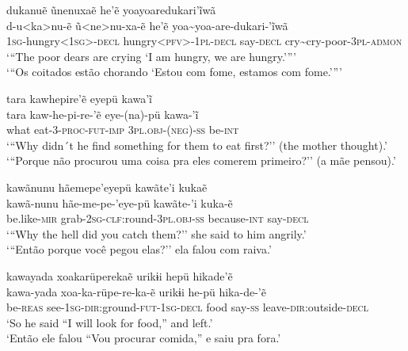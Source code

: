 \documentclass[output=paper,
modfonts,nonflat
]{langsci/langscibook}
\begin{document}
\ea dukanuẽ ũnenuxaẽ he'ẽ yoayoaredukari'ĩwã \\[.3em]
\gll d-u<ka>nu-ẽ ũ<ne>nu-xa-ẽ he'ẽ yoa\textasciitilde yoa-are-dukari-'ĩwã \\
\textsc{1sg}-hungry<\textsc{1sg}>-\textsc{decl} hungry<\textsc{pfv}>-\textsc{1pl-decl} say-\textsc{decl} cry\textasciitilde cry-poor-\textsc{3pl-admon} \\
\glt   `{``}The poor dears are crying `I am hungry, we are hungry.{'}{''}' \\
`{``}Os coitados estão chorando `Estou com fome, estamos com fome.{'}{''}' \\

\z  

\ea   tara kawhepire'ẽ eyepü kawa'ĩ \\[.3em]
\gll tara kaw-he-pi-re-'ẽ eye-(na)-pü kawa-'ĩ\\
what eat-\textsc{3-proc-fut-imp} \textsc{3pl.obj-(neg)-ss} be-\textsc{int}\\
\glt   `{``}Why didn´t he find something for them to eat first?'' (the mother thought).' \\
`{``}Porque não procurou uma coisa pra eles comerem primeiro?'' (a mãe pensou).'\\ 
\z  

\ea   kawãnunu hãemepe'eyepü kawãte'i kukaẽ \\[.3em]
\gll kawã-nunu hãe-me-pe-'eye-pü kawãte-'i kuka-ẽ\\
be.like-\textsc{mir} grab-\textsc{2sg-clf:}round-\textsc{3pl.obj-ss} because-\textsc{int} say-\textsc{decl} \\
\glt  `{``}Why the hell did you catch them?'' she said to him angrily.' \\
`{``}Então porque você pegou elas?'' ela falou com raiva.'\\

\z  

\ea   kawayada xoakarüperekaẽ urikɨi hepü hikade'ẽ \\[.3em]
\gll kawa-yada xoa-ka-rüpe-re-ka-ẽ urikɨi he-pü hika-de-'ẽ\\
be-\textsc{reas} see-\textsc{1sg-dir:}ground-\textsc{fut-1sg-decl} food say-\textsc{ss} leave-\textsc{dir:}outside-\textsc{decl}\\
\glt  `So he said ``I will look for food,'' and left.' \\
`Então ele falou ``Vou procurar comida,'' e saiu pra fora.' 
\z  
\end{document}
